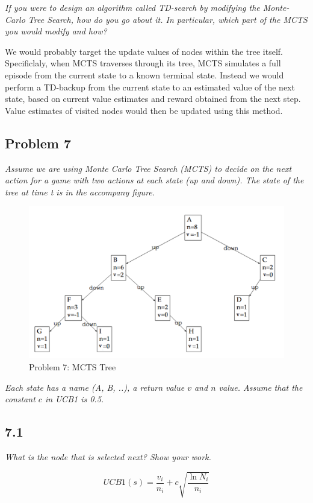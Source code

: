 \documentclass{article}
\begin{document}
\textit{If you were to design an algorithm called TD-search by modifying the Monte-Carlo Tree Search, how do you go about it. In particular, which part of the MCTS you would modify and how?}

We would probably target the update values of nodes within the tree itself. Specificlaly, when MCTS traverses through its tree, MCTS simulates a full episode from the current state to a known terminal state. Instead we would perform a TD-backup from the current state to an estimated value of the next state, based on current value estimates and reward obtained from the next step. Value estimates of visited nodes would then be updated using this method.


\subsection*{Problem 7}

\textit{Assume we are using Monte Carlo Tree Search (MCTS) to decide on the next action for a game with two actions at each state (up and down). The state of the tree at time t is in the accompany figure.}


\begin{figure}
    \centering
    \includegraphics[width=.8\linewidth]{imgs/midterm.7.png}
    \caption{Problem 7: MCTS Tree}
\end{figure}

\textit{Each state has a name (A, B, ..), a return value $v$ and $n$ value. Assume that the constant $c$ in UCB1 is 0.5.}

\subsection*{7.1}

\textit{What is the node that is selected next? Show your work.}

\begin{equation}
    UCB1(s) = \frac{v_i}{n_i}+ c \sqrt{\frac{\ln{N_i}}{n_i}}
\end{equation}
\end{document}
